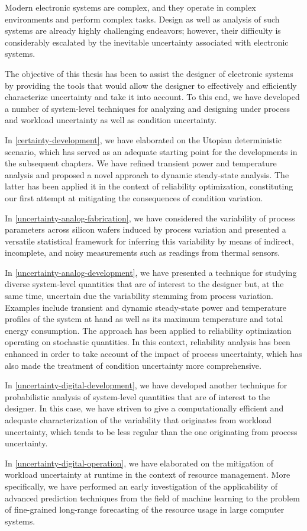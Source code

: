 Modern electronic systems are complex, and they operate in complex environments
and perform complex tasks. Design as well as analysis of such systems are
already highly challenging endeavors; however, their difficulty is considerably
escalated by the inevitable uncertainty associated with electronic systems.

The objective of this thesis has been to assist the designer of electronic
systems by providing the tools that would allow the designer to effectively and
efficiently characterize uncertainty and take it into account. To this end, we
have developed a number of system-level techniques for analyzing and designing
under process and workload uncertainty as well as condition uncertainty.

In \cref{certainty-development}, we have elaborated on the Utopian deterministic
scenario, which has served as an adequate starting point for the developments in
the subsequent chapters. We have refined transient power and temperature
analysis and proposed a novel approach to dynamic steady-state analysis. The
latter has been applied it in the context of reliability optimization,
constituting our first attempt at mitigating the consequences of condition
variation.

In \cref{uncertainty-analog-fabrication}, we have considered the variability of
process parameters across silicon wafers induced by process variation and
presented a versatile statistical framework for inferring this variability by
means of indirect, incomplete, and noisy measurements such as readings from
thermal sensors.

In \cref{uncertainty-analog-development}, we have presented a technique for
studying diverse system-level quantities that are of interest to the designer
but, at the same time, uncertain due the variability stemming from process
variation. Examples include transient and dynamic steady-state power and
temperature profiles of the system at hand as well as its maximum temperature
and total energy consumption. The approach has been applied to reliability
optimization operating on stochastic quantities. In this context, reliability
analysis has been enhanced in order to take account of the impact of process
uncertainty, which has also made the treatment of condition uncertainty more
comprehensive.

In \cref{uncertainty-digital-development}, we have developed another technique
for probabilistic analysis of system-level quantities that are of interest to
the designer. In this case, we have striven to give a computationally efficient
and adequate characterization of the variability that originates from workload
uncertainty, which tends to be less regular than the one originating from
process uncertainty.

In \cref{uncertainty-digital-operation}, we have elaborated on the mitigation of
workload uncertainty at runtime in the context of resource management. More
specifically, we have performed an early investigation of the applicability of
advanced prediction techniques from the field of machine learning to the problem
of fine-grained long-range forecasting of the resource usage in large computer
systems.
